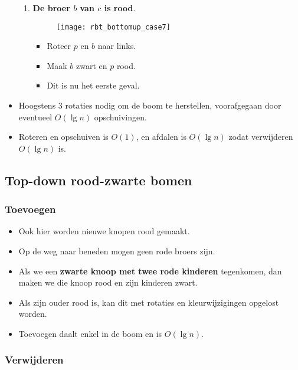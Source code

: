 \begin{itemize}
\begin{enumerate}
        \item \textbf{De broer $b$ van $c$ is rood}.
        \begin{figure}[ht]
            \centering
            \texttt{[image: rbt\_bottomup\_case7]}
            \caption{}
            \label{fig:rbt_bottomup_case7}
        \end{figure}
        \begin{itemize}
            \item Roteer $p$ en $b$ naar links.
            \item Maak $b$ zwart en $p$ rood.
            \item Dit is nu het eerste geval.
        \end{itemize}
    \end{enumerate}
    \item Hoogstens 3 rotaties nodig om de boom te herstellen, voorafgegaan door eventueel $O(\lg n)$ opschuivingen.
    \item Roteren en opschuiven is $O(1)$, en afdalen is $O(\lg n)$ zodat verwijderen $O(\lg n)$ is.
\end{itemize}


\subsection{Top-down rood-zwarte bomen}
\subsubsection{Toevoegen}
\begin{itemize}
    \item Ook hier worden nieuwe knopen rood gemaakt.
    \item Op de weg naar beneden mogen geen rode broers zijn.
    \item Als we een \textbf{zwarte knoop met twee rode kinderen} tegenkomen, dan maken we die knoop rood en zijn kinderen zwart.
    \item Als zijn ouder rood is, kan dit met rotaties en kleurwijzigingen opgelost worden.
    \item Toevoegen daalt enkel in de boom en is $O(\lg n)$.
\end{itemize}

\subsubsection{Verwijderen}



